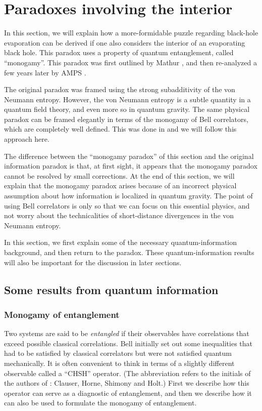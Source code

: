 \documentclass[12pt]{article}
\begin{document}
\section{Paradoxes involving the interior \label{secintpar}}
In this section, we will explain how a more-formidable puzzle regarding black-hole evaporation can be derived if one also considers the interior of an evaporating black hole. This paradox uses a property of quantum entanglement, called ``monogamy''. This paradox was first outlined by Mathur \cite{Mathur:2009hf}, and then re-analyzed a few years later by AMPS \cite{Almheiri:2012rt}. 

The original paradox was framed using the strong subadditivity of the von Neumann entropy.  However, the von Neumann entropy is a subtle quantity in a quantum field theory, and even more so in quantum gravity.   The same physical paradox can be framed elegantly in terms of the monogamy of Bell correlators, which are completely well defined. This was done in  \cite{Raju:2018zpn} and we will follow this approach here.  

 The difference between the ``monogamy paradox''  of this section and the original information paradox is that, at first sight, it appears that the monogamy paradox cannot be resolved by small corrections. At the end of this section, we will explain that the monogamy paradox arises because of an incorrect physical assumption about how information is localized in quantum gravity. The point of using Bell correlators is only so that we can focus on this essential physics, and not worry about the technicalities of short-distance divergences in the von Neumann entropy.

In this section, we first explain some
of the necessary quantum-information background, and then return to the paradox. These quantum-information results will also be important for the discussion in later sections.

\subsection{Some results from quantum information}
\subsubsection{\bf Monogamy of entanglement \label{secmonogent}}
Two systems are said to be {\em entangled} if their observables have correlations that exceed possible classical correlations. Bell initially set out some inequalities \cite{bell1964einstein} that had to be satisfied by classical correlators but were not satisfied quantum mechanically. It is often convenient to think in terms of a slightly different observable called a ``CHSH'' operator. (The abbreviation refers to the initials of the authors of \cite{Clauser:1969ny}: Clauser, Horne, Shimony and Holt.)
 First we describe how this operator can serve as a diagnostic of entanglement, and then we describe how it can also be used to formulate the monogamy of entanglement.
\end{document}

